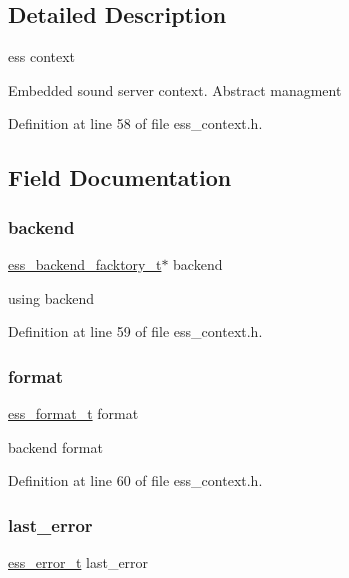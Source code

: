 \subsection{Detailed Description}
ess context 

Embedded sound server context. Abstract managment 

Definition at line 58 of file ess\+\_\+context.\+h.



\subsection{Field Documentation}
\mbox{\label{structess__context_a1fdb06c6d95c1f47d692da94aaf8af17}} 
\subsubsection{\texorpdfstring{backend}{backend}}
{\footnotesize\ttfamily \hyperlink{ess__backend_8h_ab1487f8c501b38b66796d0fbecb7ed7b}{ess\+\_\+backend\+\_\+facktory\+\_\+t}$\ast$ backend}

using backend 

Definition at line 59 of file ess\+\_\+context.\+h.

\mbox{\label{structess__context_abb4395d1c05d3bbc2e1d011507ddd19b}} 
\subsubsection{\texorpdfstring{format}{format}}
{\footnotesize\ttfamily \hyperlink{ess__format_8h_a9aa23f58a25b9e8360c1400e0cadfd80}{ess\+\_\+format\+\_\+t} format}

backend format 

Definition at line 60 of file ess\+\_\+context.\+h.

\mbox{\label{structess__context_aa6eab2e06cfd939fe9cbb74e3395520a}} 
\subsubsection{\texorpdfstring{last\+\_\+error}{last\_error}}
{\footnotesize\ttfamily \hyperlink{ess__error_8h_a08ab97fcf6745dee67de912e41bd3236}{ess\+\_\+error\+\_\+t} last\+\_\+error}

